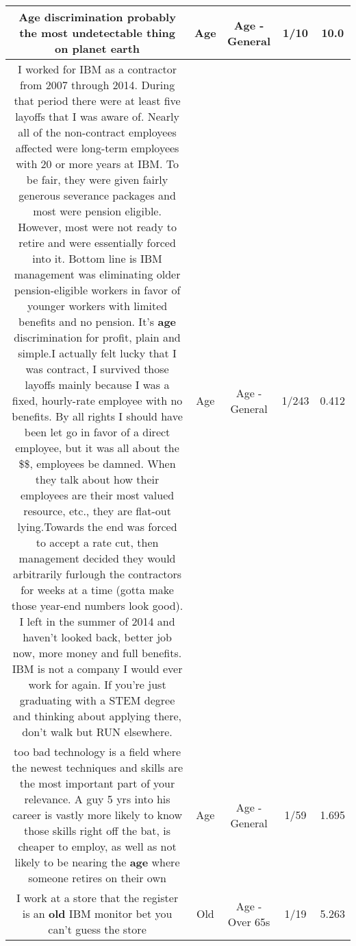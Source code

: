 \documentclass[11pt]{article}
\newlength\mylength
\begin{document}
\begin{center}
\begin{longtable}{|C{.65\mylength}|C{.30\mylength}|C{.12\mylength}|C{.12\mylength}|C{.12\mylength}|}
  \small Age discrimination probably the most undetectable thing on planet earth\normalsize   & Age & Age - General & 1/10 & 10.0 \\  \hline
  \small I worked for IBM as a contractor from 2007 through 2014. During that period there were at least five layoffs that I was aware of. Nearly all of the non-contract employees affected were long-term employees with 20 or more years at IBM. To be fair, they were given fairly generous severance packages and most were pension eligible. However, most were not ready to retire and were essentially forced into it. Bottom line is IBM management was eliminating older pension-eligible workers in favor of younger workers with limited benefits and no pension. It's \textbf{age} discrimination for profit, plain and simple.I actually felt lucky that I was contract, I survived those layoffs mainly because I was a fixed, hourly-rate employee with no benefits. By all rights I should have been let go in favor of a direct employee, but it was all about the \$\$, employees be damned. When they talk about how their employees are their most valued resource, etc., they are flat-out lying.Towards the end was forced to accept a rate cut, then management decided they would arbitrarily furlough the contractors for weeks at a time (gotta make those year-end numbers look good). I left in the summer of 2014 and haven't looked back, better job now, more money and full benefits. IBM is not a company I would ever work for again. If you're just graduating with a STEM degree and thinking about applying there, don't walk but RUN elsewhere.\normalsize   & Age & Age - General & 1/243 & 0.412 \\  \hline
  \small too bad technology is a field where the newest techniques and skills are the most important part of your relevance. A guy 5 yrs into his career is vastly more likely to know those skills right off the bat, is cheaper to employ, as well as not likely to be nearing the \textbf{age} where someone retires on their own\normalsize   & Age & Age - General & 1/59 & 1.695 \\  \hline
  \small I work at a store that the register is an \textbf{old} IBM monitor bet you can't guess the store\normalsize   & Old & Age - Over 65s & 1/19 & 5.263 \\  \hline

\end{longtable}
\end{center}
\end{document}
